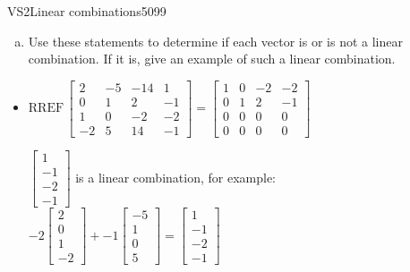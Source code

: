 \begin{exercise}{VS2}{Linear combinations}{5099}
\begin{exerciseStatement}
\begin{enumerate}[(a)]
\begin{itemize}
 
\end{itemize}

     
\item  

 Use these statements to determine if each vector is or is not a linear combination. If it is, give an example of such a linear combination. 

 
\end{enumerate}

     \end{exerciseStatement}
 \begin{exerciseAnswer} 

\begin{itemize}
\item  

 \(
\mathrm{RREF}\, \left[\begin{array}{ccc|c}
2 & -5 & -14 & 1 \\
0 & 1 & 2 & -1 \\
1 & 0 & -2 & -2 \\
-2 & 5 & 14 & -1
\end{array}\right] = \left[\begin{array}{ccc|c}
1 & 0 & -2 & -2 \\
0 & 1 & 2 & -1 \\
0 & 0 & 0 & 0 \\
0 & 0 & 0 & 0
\end{array}\right]
                        \) 

 

 \(\left[\begin{array}{c}
1 \\
-1 \\
-2 \\
-1
\end{array}\right]\) is a linear combination, for example: \(
-2 \left[\begin{array}{c}
2 \\
0 \\
1 \\
-2
\end{array}\right] + -1 \left[\begin{array}{c}
-5 \\
1 \\
0 \\
5
\end{array}\right] = \left[\begin{array}{c}
1 \\
-1 \\
-2 \\
-1
\end{array}\right]
                            \) 


\end{itemize}
\end{exerciseAnswer}
\end{exercise}
